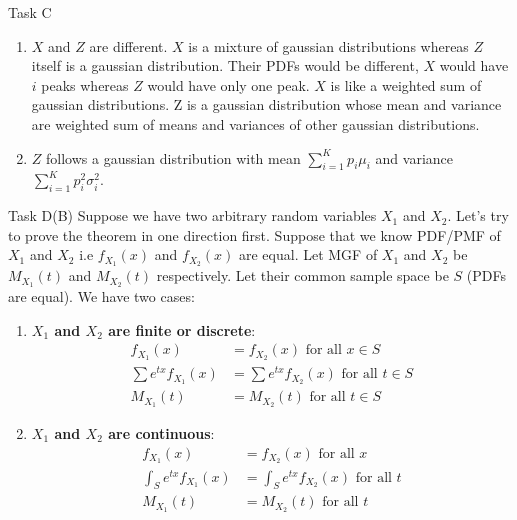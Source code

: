 \begin{task}{Task C}
\begin{enumerate}
		\item $X$ and $Z$ are different. $X$ is a mixture of gaussian distributions
		      whereas $Z$ itself is a gaussian distribution. Their PDFs would be
		      different, $X$ would have $i$ peaks whereas $Z$ would have only one
		      peak. $X$ is like a weighted sum of gaussian distributions. Z is a
		      gaussian distribution whose mean and variance are weighted sum of means
		      and variances of other gaussian distributions.

		\item $Z$ follows a gaussian distribution with mean $\sum_{i=1}^K p_i\mu_i$ and variance $\sum_{i=1}^Kp_i^2\sigma_i^2$.
	\end{enumerate}
\end{task}

\begin{task}{Task D(B)}
	Suppose we have two arbitrary random variables $X_1$ and $X_2$. Let's
	try to prove the theorem in one direction first. Suppose that we know
	PDF/PMF of $X_1$ and $X_2$ i.e $f_{X_1}(x)$ and $f_{X_2}(x)$ are equal.
	Let MGF of $X_1$ and $X_2$ be $M_{X_1}(t)$ and $M_{X_2}(t)$
	respectively. Let their common sample space be $S$ (PDFs are equal).
	We have two cases:
	\begin{enumerate}
		\item \textbf{$X_1$ and $X_2$ are finite or discrete}:
		      \begin{align}
			      f_{X_1}(x)            & = f_{X_2}(x) \text{ for all } x \in S            \\
			      \sum e^{tx}f_{X_1}(x) & = \sum e^{tx}f_{X_2}(x) \text{ for all } t \in S \\
			      M_{X_1}(t)            & = M_{X_2}(t) \text{ for all } t \in S
		      \end{align}
		\item \textbf{$X_1$ and $X_2$ are continuous}:
		      \begin{align}
			      f_{X_1}(x)                & = f_{X_2}(x) \text{ for all } x              \\
			      \int_{S} e^{tx}f_{X_1}(x) & = \int_S e^{tx}f_{X_2}(x) \text{ for all } t \\
			      M_{X_1}(t)                & = M_{X_2}(t) \text{ for all } t
		      \end{align}
	\end{enumerate}


\end{task}
